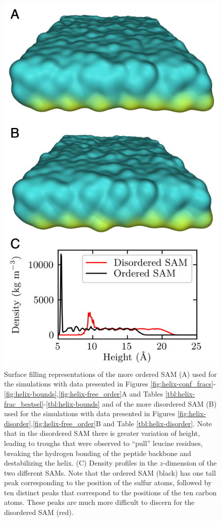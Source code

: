 \begin{figure}
    \center
    \includegraphics[width=\single]{figures-helix/order_figures.png}
    \caption[Comparison of the ordered and disordered SAM]{
        Surface filling representations of the more ordered SAM (A) used for the simulations with data presented in Figures \ref{fig:helix-conf_fracs}-\ref{fig:helix-bounds},\ref{fig:helix-free_order}A and Tables \ref{tbl:helix-frac_bestsel}-\ref{tbl:helix-bounds} and of the more disordered SAM (B) used for the simulations with data presented in Figures \ref{fig:helix-disorder},\ref{fig:helix-free_order}B and Table \ref{tbl:helix-disorder}. 
        Note that in the disordered SAM there is greater variation of height, leading to troughs that were observed to ``pull'' leucine residues, breaking the hydrogen bonding of the peptide backbone and destabilizing the helix. 
        (C) Density profiles in the $z$-dimension of the two different SAMs. 
        Note that the ordered SAM (black) has one tall peak corresponding to the position of the sulfur atoms, followed by ten distinct peaks that correspond to the positions of the ten carbon atoms. 
        These peaks are much more difficult to discern for the disordered SAM (red).
    }
    \label{fig:helix-disordered_sam}
\end{figure}


